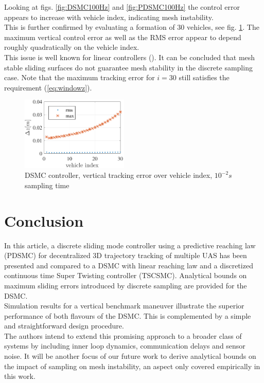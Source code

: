 \documentclass{ifacconf}
\newcommand{\idxFollower}{{\ensuremath{i} }}
\begin{document}
Looking at figs.  \ref{fig:DSMC100Hz} and \ref{fig:PDSMC100Hz} the control error appears to increase with vehicle index, indicating mesh instability.\\
This is further confirmed by evaluating a formation of 30 vehicles, see fig. \ref{fig:errroamplification}. The maximum vertical control error as well as the RMS  error appear to depend roughly quadratically on the vehicle index.\\
This issue is well known for linear controllers (\cite{Pant2002}). It can be concluded that mesh stable sliding surfaces do not guarantee mesh stability in the discrete sampling case.
Note that the maximum tracking error for $\idxFollower = 30$ still satisfies the requirement (\ref{eq:windowz}).
\begin{figure}[h!]
\begin{center}
\includegraphics[height=3.5cm]{erroramplification-DSMC-100Hz-TIMESCALESEPARATION-turbulence=1-turbulenceonlyfirstUAS}    %
\caption{ DSMC controller, vertical tracking error over vehicle index, $10^{-2} s$ sampling time}
\label{fig:errroamplification}
\end{center}
\end{figure}
{\section{Conclusion}
\label{sec:conclusion}
In this article, a discrete sliding mode controller using a predictive reaching law (PDSMC) for decentralized 3D trajectory tracking of multiple UAS has been presented and compared to a DSMC with linear reaching law and a discretized continuous time Super Twisting controller (TSCSMC). Analytical bounds on maximum sliding errors introduced by discrete sampling are provided for the DSMC.\\ 
Simulation results for a vertical benchmark maneuver illustrate the superior performance of both flavours of the DSMC. This is complemented by a simple and straightforward design procedure.\\ 
The authors intend to extend this promising approach to a broader class of systems by including inner loop dynamics, communication delays and sensor noise. It will be another focus of our future work to derive analytical bounds on the impact of sampling on mesh instability, an aspect only covered empirically in this work.
}
\end{document}
